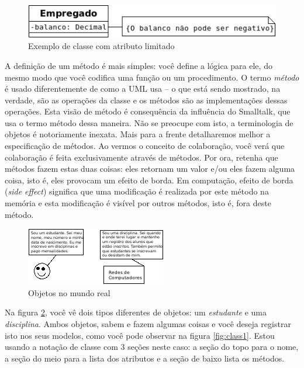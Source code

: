 \begin{figure}[h]
\begin{center}
\includegraphics[scale=0.7]{umlClsLmt.png} 
\caption{Exemplo de classe com atributo limitado} \label{fig:umlClsLmt}
\end{center}
\end{figure}

A definição de um método é mais simples: você define a lógica para ele, do mesmo modo que você codifica uma função ou um procedimento. O termo \emph{método} é usado diferentemente de como a UML usa -- o que está sendo mostrado, na verdade, são as operações da classe e os métodos são as implementações dessas operações. Esta visão de método é consequência da influência do Smalltalk, que usa o termo método dessa maneira. Não se preocupe com isto, a terminologia de objetos é notoriamente inexata. Mais para a frente detalharemos melhor a especificação de métodos. Ao vermos o conceito de colaboração, você verá que colaboração é feita exclusivamente através de métodos. Por ora, retenha que métodos fazem estas duas coisas: eles retornam um valor e/ou eles fazem alguma coisa, isto é, eles provocam um efeito de borda. Em computação, efeito de borda (\emph{side effect}) significa que uma modificação é realizada por este método na memória e esta modificação é visível por outros métodos, isto é, fora deste método.

\begin{figure}
\begin{center}
\includegraphics[scale=1]{obj2.png} 
\caption[Objetos no mundo real]{Objetos no mundo real} \label{fig:obj2}
\end{center}
\end{figure}

Na figura \ref{fig:obj2}, você vê dois tipos diferentes de objetos: um \textit{estudante} e uma \textit{disciplina}. Ambos objetos, sabem e fazem algumas coisas e você deseja registrar isto nos seus modelos, como você pode observar na figura \ref{fig:class1}. Estou usando a notação de classe com 3 seções neste caso: a seção do topo para o nome, a seção do meio para a lista dos atributos e a seção de baixo lista os métodos.


